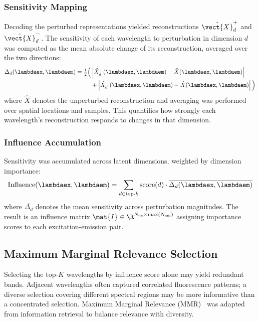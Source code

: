\subsubsection{Sensitivity Mapping}
Decoding the perturbed representations yielded reconstructions $\hat{\vect{X}}^{+}_d$ and $\hat{\vect{X}}^{-}_d$.
The sensitivity of each wavelength to perturbation in dimension $d$ was computed as the mean absolute change of its reconstruction, averaged over the two directions:
\begin{equation}
\begin{split}
\Delta_d(\lambdaex, \lambdaem) = \tfrac{1}{2}\Big( &\left| \hat{X}^{+}_d(\lambdaex, \lambdaem) - \hat{X}(\lambdaex, \lambdaem) \right| \\
&+ \left| \hat{X}^{-}_d(\lambdaex, \lambdaem) - \hat{X}(\lambdaex, \lambdaem) \right| \Big)
\end{split}
\label{eq:sensitivity}
\end{equation}
where $\hat{X}$ denotes the unperturbed reconstruction and averaging was performed over spatial locations and samples.
This quantifies how strongly each wavelength's reconstruction responds to changes in that dimension.

\subsubsection{Influence Accumulation}
Sensitivity was accumulated across latent dimensions, weighted by dimension importance:
\begin{equation}
\text{Influence}(\lambdaex, \lambdaem) = \sum_{d \in \text{top-}k} \text{score}(d) \cdot \overline{\Delta_d(\lambdaex, \lambdaem)}
\label{eq:influence}
\end{equation}
where $\overline{\Delta_d}$ denotes the mean sensitivity across perturbation magnitudes.
The result is an influence matrix $\mat{I} \in \R^{N_{\text{ex}} \times \max(N_{\text{em}})}$ assigning importance scores to each excitation-emission pair.

\subsection{Maximum Marginal Relevance Selection}
\label{sec:mmr}

Selecting the top-$K$ wavelengths by influence score alone may yield redundant bands.
Adjacent wavelengths often captured correlated fluorescence patterns; a diverse selection covering different spectral regions may be more informative than a concentrated selection.
Maximum Marginal Relevance (MMR)~\cite{carbonell1998use} was adapted from information retrieval to balance relevance with diversity.

